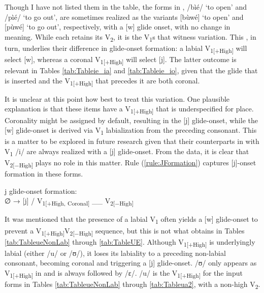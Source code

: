 \documentclass[output=paper,colorlinks,citecolor=brown]{langscibook}
\begin{document}
Though I have not listed them in the table, the forms in , /bìé/ ‘to open’ and /pìé/ ‘to go out', are sometimes realized as the variants [bùwé] ‘to open’ and [pùwé] ‘to go out', respectively, with a [w] glide onset, with no change in meaning. While each retains its V\textsubscript{2}, it is the V\textsubscript{1}s that witness  variation. This , in turn, underlies their difference in glide-onset formation: a labial V\textsubscript{1[+High]} will select [w], whereas a coronal V\textsubscript{1[+High]} will select [j]. The latter outcome is relevant in Tables \ref{tab:Tableie_ia} and \ref{tab:Tableie_io}, given that the glide that is inserted and the V\textsubscript{1[+High]} that precedes it are both coronal.

It is unclear at this point how best to treat this variation. One plausible explanation is that these items have a V\textsubscript{1[+High]} that is  underspecified for place. Coronality might be assigned by default, resulting in the [j] glide-onset, while the [w] glide-onset is derived via V\textsubscript{1} labialization from the preceding consonant. This is a matter to be explored in future research given that their counterparts in  with V\textsubscript{1} /i/ are always realized with a [j] glide-onset. From the data, it is clear that V\textsubscript{2[−High]} plays no role in this matter. Rule (\ref{rule:JFormation}) captures [j]-onset formation in these forms.

\ea \label{rule:JFormation}
\begin{xlist}
     j glide-onset formation: \\
∅ → [j] / V\textsubscript{1[+High, Coronal]} \_\_ V\textsubscript{2[−High]} \\
\end{xlist}
\z

It was mentioned that the presence of a labial V\textsubscript{1} often yields a [w] glide-onset to prevent a V\textsubscript{1[+High]}V\textsubscript{2[−High]} sequence, but this is not what obtains in Tables \ref{tab:TableueNonLab} through \ref{tab:TableUE}. Although V\textsubscript{1[+High]} is underlyingly labial (either /u/ or /ʊ/), it loses its  labiality to a preceding non-labial consonant, becoming coronal and triggering a [j] glide-onset. /ʊ/ only appears as V\textsubscript{1[+High]} in  and is always followed by /ɛ/. /u/ is the V\textsubscript{1[+High]} for the input forms in Tables \ref{tab:TableueNonLab} through \ref{tab:Tableua2}, with a non-high V\textsubscript{2}.
\end{document}
